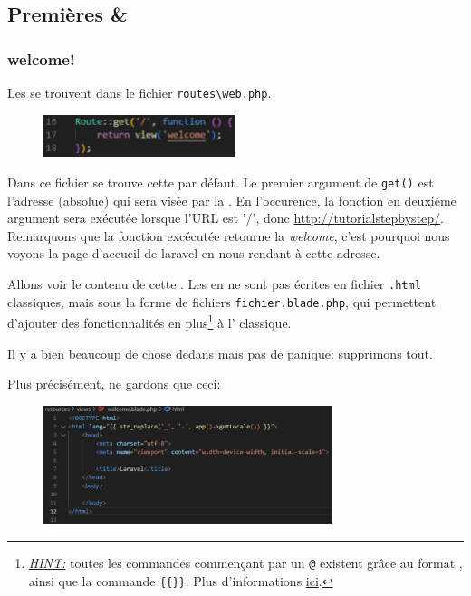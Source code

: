 \subsection{Premières \routes{} \& \views{}}

\subsubsection[welcome!]{welcome!\label{sec:welcome!}}
Les \routes{} se trouvent dans le fichier \verb|routes\web.php|. \\
\begin{figure}
    \vspace{-0.5cm}
    \includegraphics[width=0.5\textwidth]{figures-C1/basic_route.pdf}
\end{figure}
Dans ce fichier se trouve cette \route{} par défaut. Le premier argument de \verb|get()| est l'adresse (absolue) qui sera visée par la \route{}. En l'occurence, la fonction en deuxième argument sera exécutée lorsque l'URL est '/', donc \url{http://tutorialstepbystep/}. Remarquons que la fonction excécutée retourne la \view{} \textit{welcome}, c'est pourquoi nous voyons la page d'accueil de laravel en nous rendant à cette adresse.

Allons voir le contenu de cette \view{}. Les \views{} en \laravel{} ne sont pas écrites en fichier \verb|.html| classiques, mais sous la forme de fichiers \verb|fichier.blade.php|, qui permettent d'ajouter des fonctionnalités en plus\footnote{\textit{\underline{HINT:}} toutes les commandes commençant par un \verb|@| existent grâce au format \blade{}, ainsi que la commande \verb|{{}}|. Plus d'informations \href{https://laravel.com/docs/10.x/blade#blade-directives}{ici}.} à l'\html{} classique. 

Il y a bien beaucoup de chose dedans mais pas de panique: supprimons tout.

Plus précisément, ne gardons que ceci:

\begin{figure}[!h]
    \centering
    \includegraphics[width=0.75\textwidth]{figures-C1/welcome_blade_empty.pdf}
\end{figure}

